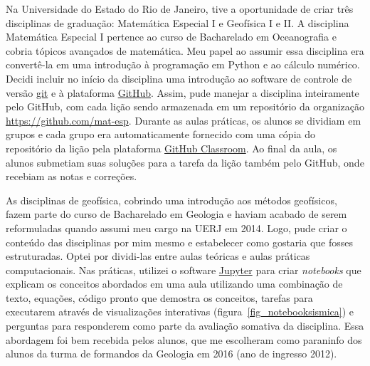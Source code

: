 \documentclass[10pt,a4paper,oneside]{book}
\newcommand{\UERJ}{Universidade do Estado do Rio de Janeiro}
\begin{document}
Na \UERJ{}, tive a oportunidade de criar três disciplinas de graduação:
Matemática Especial I e Geofísica I e II.
A disciplina Matemática Especial I pertence ao curso de Bacharelado em
Oceanografia e cobria tópicos avançados de matemática.
Meu papel ao assumir essa disciplina era convertê-la em uma introdução à
programação em Python e ao cálculo numérico.
Decidi incluir no início da disciplina uma introdução ao software de controle
de versão \href{https://git-scm.com/}{git} e à plataforma
\href{https://github.com/}{GitHub}.
Assim, pude manejar a disciplina inteiramente pelo GitHub, com cada lição
sendo armazenada em um repositório da organização
\url{https://github.com/mat-esp}.
Durante as aulas práticas, os alunos se dividiam em grupos e cada grupo era
automaticamente fornecido com uma cópia do repositório da lição pela plataforma
\href{https://classroom.github.com/}{GitHub Classroom}.
Ao final da aula, os alunos submetiam suas soluções para a tarefa da lição
também pelo GitHub, onde recebiam as notas e correções.

As disciplinas de geofísica, cobrindo uma introdução aos métodos geofísicos,
fazem parte do curso de Bacharelado em Geologia e haviam acabado de serem
reformuladas quando assumi meu cargo na UERJ em 2014.
Logo, pude criar o conteúdo das disciplinas por mim mesmo e estabelecer como
gostaria que fosses estruturadas.
Optei por dividi-las entre aulas teóricas e aulas práticas computacionais.
Nas práticas, utilizei o software \href{https://jupyter.org/}{Jupyter} para
criar \textit{notebooks} que explicam os conceitos abordados em uma aula
utilizando uma combinação de texto, equações, código pronto que demostra os
conceitos, tarefas para executarem através de visualizações interativas
(figura~\ref{fig_notebooksismica}) e perguntas para responderem como parte da
avaliação somativa da disciplina.
Essa abordagem foi bem recebida pelos alunos, que me escolheram como paraninfo
dos alunos da turma de formandos da Geologia em 2016 (ano de ingresso 2012).
\end{document}
